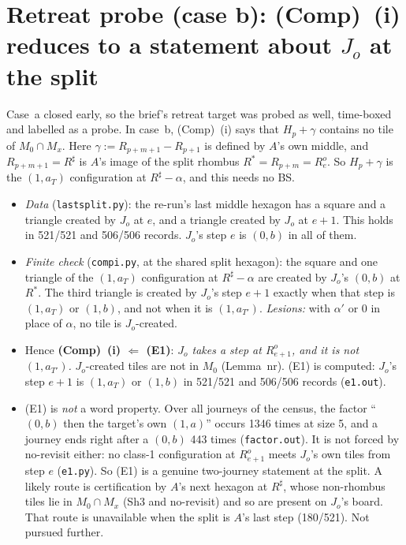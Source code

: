 \documentclass[11pt]{article}
\theoremstyle{definition}\newtheorem{definition}[theorem]{Definition}\newtheorem{remark}[theorem]{Remark}
\begin{document}
\section{Retreat probe (case b): (Comp)~(i) reduces to a statement about $J_o$ at the split}\label{sec:compi}
Case~a closed early, so the brief's retreat target was probed as well, time-boxed and labelled as a probe. In case~b, (Comp)~(i) says that $H_p+\gamma$ contains no tile of $M_0\cap M_x$. Here $\gamma:=R_{p+m+1}-R_{p+1}$ is defined by $A$'s own middle, and $R_{p+m+1}=R^\sharp$ is $A$'s image of the split rhombus $R^\ast=R_{p+m}=R^o_e$. So $H_p+\gamma$ is the $(1,a_T)$ configuration at $R^\sharp-\alpha$, and this needs no BS.
\begin{itemize}
\item \emph{Data} (\texttt{lastsplit.py}): the re-run's last middle hexagon has a square and a triangle created by $J_o$ at $e$, and a triangle created by $J_o$ at $e+1$. This holds in 521/521 and 506/506 records. $J_o$'s step $e$ is $(0,b)$ in all of them.
\item \emph{Finite check} (\texttt{compi.py}, at the shared split hexagon): the square and one triangle of the $(1,a_T)$ configuration at $R^\sharp-\alpha$ are created by $J_o$'s $(0,b)$ at $R^\ast$. The third triangle is created by $J_o$'s step $e+1$ exactly when that step is $(1,a_T)$ or $(1,b)$, and not when it is $(1,a_{T'})$. \emph{Lesions:} with $\alpha'$ or $0$ in place of $\alpha$, no tile is $J_o$-created.
\item Hence \textbf{(Comp)~(i) $\Leftarrow$ (E1)}: \emph{$J_o$ takes a step at $R^o_{e+1}$, and it is not $(1,a_{T'})$.} $J_o$-created tiles are not in $M_0$ (Lemma~nr). (E1) is computed: $J_o$'s step $e+1$ is $(1,a_T)$ or $(1,b)$ in 521/521 and 506/506 records (\texttt{e1.out}).
\item (E1) is \emph{not} a word property. Over all journeys of the census, the factor ``$(0,b)$ then the target's own $(1,a)$'' occurs 1346 times at size 5, and a journey ends right after a $(0,b)$ 443 times (\texttt{factor.out}). It is not forced by no-revisit either: no class-1 configuration at $R^o_{e+1}$ meets $J_o$'s own tiles from step $e$ (\texttt{e1.py}). So (E1) is a genuine two-journey statement at the split. A likely route is certification by $A$'s next hexagon at $R^\sharp$, whose non-rhombus tiles lie in $M_0\cap M_x$ (Sh3 and no-revisit) and so are present on $J_o$'s board. That route is unavailable when the split is $A$'s last step (180/521). Not pursued further.
\end{itemize}
\end{document}
